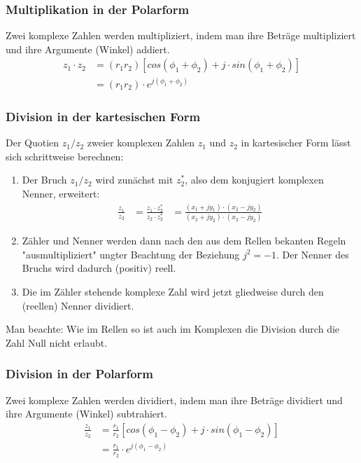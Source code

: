 \subsubsection*{Multiplikation in der Polarform}
\begin{definition}
Zwei komplexe Zahlen werden multipliziert, indem man ihre Beträge multipliziert und ihre Argumente (Winkel) addiert.
\begin{align*}
	z_1 \cdot z_2 	&= (r_1r_2)[cos(\phi_1 +\phi_2) +j \cdot sin(\phi_1 + \phi_2)] \\
							&= (r_1r_2) \cdot e^{j(\phi_1 + \phi_2)}
\end{align*}
\end{definition}

\subsubsection*{Division in der kartesischen Form}
\begin{definition}
Der Quotien $z_1/z_2$ zweier komplexen Zahlen $z_1$ und $z_2$ in kartesischer Form lässt sich schrittweise berechnen:
\begin{enumerate}
	\item Der Bruch $z_1/z_2$ wird zunächst mit $z_2^*$, also dem konjugiert komplexen Nenner, erweitert:
	\begin{align*}
	\frac{z_1}{z_2} 	&= \frac{z_1 \cdot z_2^*}{z_2 \cdot z_2^*} &= \frac{(x_1 +jy_1) \cdot (x_2-jy_2)}{(x_2+jy_2)\cdot (x_2-jy_2)}
	\end{align*}
	\item Zähler und Nenner werden dann nach den aus dem Rellen bekanten Regeln "ausmultipliziert" ungter Beachtung der Beziehung $j^2 = -1$. Der Nenner des Bruchs wird dadurch (positiv) reell.
	\item Die im Zähler stehende komplexe Zahl wird jetzt gliedweise durch den (reellen) Nenner dividiert.
\end{enumerate}
Man beachte: Wie im Rellen so ist auch im Komplexen die Division durch die Zahl Null nicht erlaubt.
\end{definition}

\subsubsection*{Division in der Polarform}
\begin{definition}
Zwei komplexe Zahlen werden dividiert, indem man ihre Beträge dividiert und ihre Argumente (Winkel) subtrahiert.
\begin{align*}
	\frac{z_1}{z_2} 	&= \frac{r_1}{r_2}[cos(\phi_1 -\phi_2) +j \cdot sin(\phi_1 - \phi_2)] \\
							&= \frac{r_1}{r_2} \cdot e^{j(\phi_1 - \phi_2)}
\end{align*}
\end{definition}

